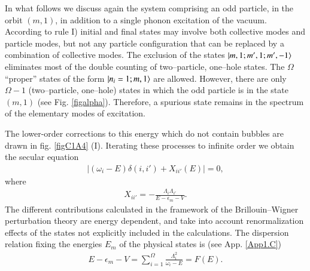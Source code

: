 In what follows we discuss again the system comprising an odd particle, in the orbit $(m, 1)$, in addition to a single phonon excitation of the vacuum. 
According to rule I) initial and final states may involve both collective modes and particle modes, but not any particle configuration that can be replaced by a combination of collective modes. The exclusion of the states $|{m,1; m',1;m',-1} \rangle$ eliminates most of the double counting of two--particle, one--hole states. The $\Omega$ ``proper'' states of the form $|{n_i=1;m,1} \rangle$ are allowed. However, 
there are only $\Omega-1$ (two--particle, one--hole) states in which the odd particle is in the state $(m, 1)$ (see Fig. \ref{figalpha}). Therefore, a spurious state remains in the spectrum of the elementary modes of excitation. 



The lower-order corrections to this energy which do not contain bubbles 
are drawn in fig. \ref{figC1A4} (I). Iterating these processes to infinite order we obtain the secular equation 
  \begin{align}\label{eqC1A56} 
\left|(\omega_i-E)\delta(i,i')+X_{ii'}(E)\right|=0,
  \end{align} 
  where
    \begin{align}\label{eqC1A57} 
   X_{ii'}=-\frac{\Lambda_i\Lambda_{i'}}{E-\epsilon_m-V}.
    \end{align} 
The different contributions calculated in the framework of the Brillouin--Wigner perturbation theory are energy dependent, and take into account renormalization effects of the states not explicitly included in the calculations. The dispersion relation fixing the energies $E_m$ of the physical states is (see App. \ref{App1.C})
  \begin{align}\label{eqC1A60} 
 E-\epsilon_m-V=\sum_{i=1}^{\Omega}\frac{\Lambda_i^2}{\omega_i-E}=F(E).
  \end{align} 


